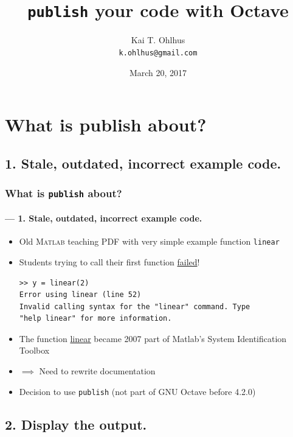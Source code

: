\documentclass[xcolor=svgnames]{beamer}
\title{\texttt{publish} your code with Octave}
\author[Ohlhus]{Kai T. Ohlhus \\ \texttt{k.ohlhus@gmail.com}}
\institute{OctConf 2017}
\date{March 20, 2017}
\begin{document}
\frame{\titlepage}



\section{What is publish about?}



\subsection{1. Stale, outdated, incorrect example code.}



\begin{frame}[fragile]
\frametitle{What is \texttt{publish} about?}
\framesubtitle<2>{--- 1. Stale, outdated, incorrect example code.}

\begin{itemize}
\item Old \textsc{Matlab} teaching PDF
  with very simple example function {\color{blue}\lstinline|linear|}

\item Students trying to call their first function \underline{failed}!

\begin{lstlisting}[language={}]
>> y = linear(2)
Error using linear (line 52)
Invalid calling syntax for the "linear" command. Type
"help linear" for more information.
\end{lstlisting}

\item<2> The function \href{https://www.mathworks.com/help/ident/ref/linear.html}{linear}
became 2007 part of Matlab's System Identification Toolbox
\item<2> $\implies$ Need to rewrite documentation
\item<2> Decision to use \texttt{publish}
  (not part of GNU Octave before 4.2.0)
\end{itemize}
\end{frame}



\subsection{2. Display the output.}
\end{document}
